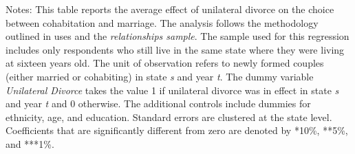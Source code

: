 \begin{table}[H]\centering                                  \scriptsize                                                                  \caption{The average effect of unilateral divorce on the choice of cohabitation vs. marriage among newly formed couples. Sample of never movers}                                   \label{tab:tabrelkeep}                                 
\begin{minipage}{\textwidth}
\scriptsize\smallskip
Notes: This table reports the average effect of unilateral divorce on the choice between cohabitation and marriage. The analysis follows the methodology outlined in \cite{borusyak2021} uses and the \textit{relationships sample}. The sample used for this regression includes only respondents who still live in the same state where they were living at sixteen years old. The unit of observation refers to newly formed couples (either married or cohabiting) in state \textit{s} and year \textit{t}. The dummy variable \textit{Unilateral Divorce} takes the value 1 if unilateral divorce was in effect in state \textit{s} and year \textit{t} and 0 otherwise. The additional controls include dummies for ethnicity, age, and education. Standard errors are clustered at the state level. Coefficients that are significantly different from zero are denoted by *10\%, **5\%, and ***1\%.
\\
\end{minipage}
\end{table}
